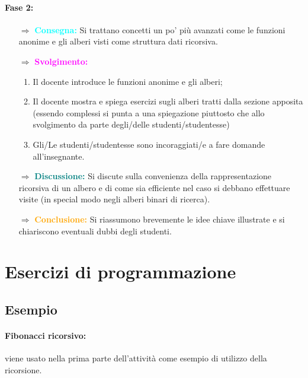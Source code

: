 
\paragraph{Fase 2:}

\begin{itemize}
    \item [$\Rightarrow$] \textbf{\textcolor{cyan}{Consegna:}} Si trattano concetti un po' più avanzati come le funzioni anonime
    e gli alberi visti come struttura dati ricorsiva.
    \item [$\Rightarrow$] \textbf{\textcolor{magenta}{Svolgimento:}}
    \begin{enumerate}
        \item Il docente introduce le funzioni anonime e gli alberi;
        \item Il docente mostra e spiega esercizi sugli alberi tratti dalla sezione apposita (essendo complessi si punta a una spiegazione piuttosto che allo svolgimento da parte degli/delle studenti/studentesse)
        \item Gli/Le studenti/studentesse sono incoraggiati/e a fare domande all'insegnante.
    \end{enumerate}
    \item [$\Rightarrow$] \textbf{\textcolor{teal}{Discussione:}} Si discute sulla convenienza della rappresentazione ricorsiva di un albero e di
    come sia efficiente nel caso si debbano effettuare visite (in special modo negli alberi binari di ricerca).
    \item [$\Rightarrow$] \textbf{\textcolor{orange}{Conclusione:}} Si riassumono brevemente le idee chiave illustrate e si chiariscono eventuali dubbi degli 
    studenti.
\end{itemize}

\pagebreak

\section{Esercizi di programmazione}\label{prog}

\subsection{Esempio}

\paragraph{Fibonacci ricorsivo:} viene usato nella prima parte dell'attività come esempio
di utilizzo della ricorsione.

